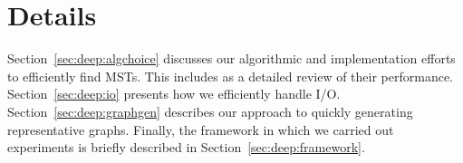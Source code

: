\section{Details}
\label{sec:deep}
Section~\ref{sec:deep:algchoice} discusses our algorithmic and implementation
efforts to efficiently find MSTs.  This includes as a detailed review of their
performance.  Section~\ref{sec:deep:io} presents how we efficiently handle I/O.
Section~\ref{sec:deep:graphgen} describes our approach to quickly generating
representative graphs.  Finally, the framework in which we carried out
experiments is briefly described in Section~\ref{sec:deep:framework}.





